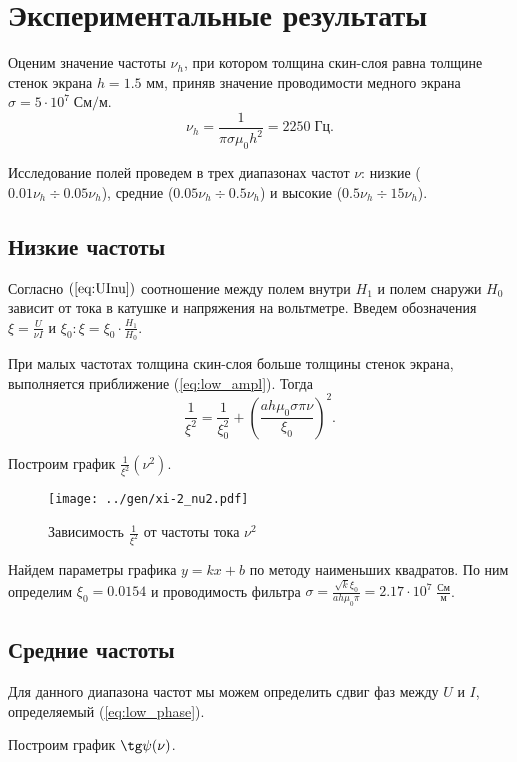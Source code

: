 \section*{Экспериментальные результаты}

Оценим значение частоты $\nu_h$, при котором толщина скин-слоя равна толщине стенок экрана $h = 1.5$ мм, приняв значение проводимости медного экрана $\sigma = 5 \cdot 10^7 \; \text{См}/\text{м}$.
$$ \nu_h = \frac{1}{\pi \sigma \mu_0 h^2} = 2250 \; \text{Гц}. $$ 

Исследование полей проведем в трех диапазонах частот $\nu$: низкие ($0.01 \nu_h \div 0.05 \nu_h$), средние ($0.05 \nu_h \div 0.5 \nu_h$) и высокие ($0.5 \nu_h \div 15 \nu_h$).

\subsection*{Низкие частоты}

Согласно $(\ref{eq:UInu})$ соотношение между полем внутри $H_1$ и полем снаружи $H_0$ зависит от тока в катушке и напряжения на вольтметре. Введем обозначения $\xi = \frac{U}{\nu I}$ и $\xi_0: \xi = \xi_0 \cdot \frac{H_1}{H_0}$. 

При малых частотах толщина скин-слоя больше толщины стенок экрана, выполняется приближение (\ref{eq:low_ampl}). Тогда
$$\frac{1}{\xi^2} = \frac{1}{\xi_0^2} + \left(\frac{ah\mu_0 \sigma \pi \nu}{\xi_0}\right)^2.$$

Построим график $\frac{1}{\xi^2}(\nu^2)$.

\begin{figure}[H]
	\centering
	\texttt{[image: ../gen/xi-2\_nu2.pdf]}
	\caption{Зависимость $\frac{1}{\xi^2}$ от частоты тока $\nu^2$}
	\label{fig:xi-2_nu2}
\end{figure}

Найдем параметры графика $y = kx + b$ по методу наименьших квадратов. По ним определим $\xi_0 = 0.0154$ и проводимость фильтра $\sigma = \frac{\sqrt{k} \xi_0}{a h \mu_0 \pi} = 2.17 \cdot 10^7 \; \frac{\text{См}}{\text{м}}$.

\subsection*{Средние частоты}

Для данного диапазона частот мы можем определить сдвиг фаз между $U$ и $I$, определяемый (\ref{eq:low_phase}). 

Построим график $\tg \psi (\nu)$.

